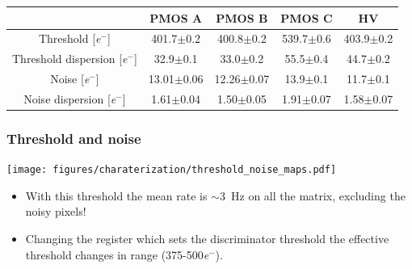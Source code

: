 \begin{frame}
\begin{columns}
        \end{columns}                  
        \begin{table}[h!]
            \tiny
            \begin{center}
            \begin{tabular}{| c |  c | c | c |c |}
            \hline
            & PMOS A & PMOS B & PMOS C & HV \\
            \hline
            \hline
            Threshold [\si{\elementarycharge}$^-$] & 401.7$\pm$0.2 & 400.8$\pm$0.2 & 539.7$\pm$0.6 &  403.9$\pm$0.2\\
            Threshold dispersion [\si{\elementarycharge}$^-$] & 32.9$\pm$0.1 & 33.0$\pm$0.2 & 55.5$\pm$0.4 & 44.7$\pm$0.2\\
            Noise [\si{\elementarycharge}$^-$] & 13.01$\pm$0.06 & 12.26$\pm$0.07 & 13.9$\pm$0.1 & 11.7$\pm$0.1\\
            Noise dispersion [\si{\elementarycharge}$^-$] & 1.61$\pm$0.04 & 1.50$\pm$0.05 & 1.91$\pm$0.07 & 1.58$\pm$0.07\\
            \hline
            \end{tabular}
            \end{center}
        \end{table}       

    \end{frame}


    \begin{frame}
        \frametitle{Threshold and noise}
        \centering
        \texttt{[image: figures/charaterization/threshold\_noise\_maps.pdf]}
        \begin{itemize}
            \item With this threshold the mean rate is $\sim$\SI{3}{Hz} on all the matrix, excluding the noisy pixels!
            \item Changing the register which sets the discriminator threshold the effective threshold changes in range (375-500\si{\elementarycharge}$^-$).
        \end{itemize}
    \end{frame}


